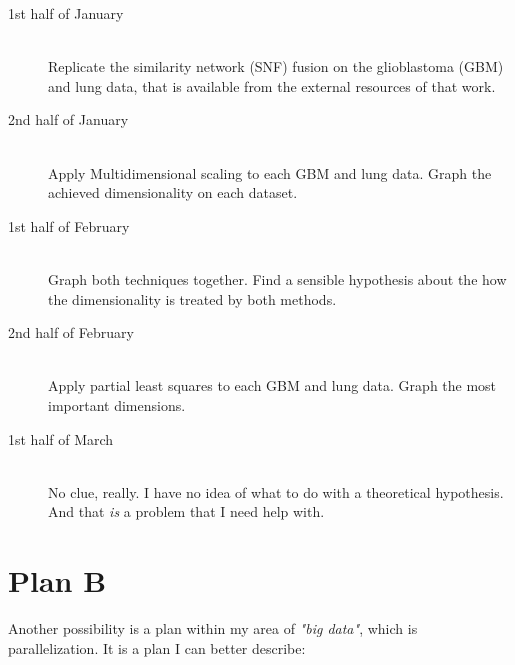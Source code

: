 \documentclass[11pt,a4paper,twoside,openright]{report}
\begin{document}
\begin{description}
\item[1st half of January] \hfill \\
Replicate the similarity network (SNF) fusion on the glioblastoma (GBM) and
lung data, that is available from the external resources of that work.

\item[2nd half of January] \hfill \\
Apply Multidimensional scaling to each GBM and lung data.  Graph the achieved
dimensionality on each dataset.

\item[1st half of February] \hfill \\
Graph both techniques together.  Find a sensible hypothesis about the how the
dimensionality is treated by both methods.

\item[2nd half of February] \hfill \\
Apply partial least squares to each GBM and lung data.  Graph the most
important dimensions.

\item[1st half of March] \hfill \\
No clue, really.  I have no idea of what to do with a theoretical hypothesis.
And that \emph{is} a problem that I need help with.
\end{description}

\clearpage{\pagestyle{empty}\cleardoublepage}
\chapter{Plan B}

Another possibility is a plan within my area of \emph{"big data"}, which is
parallelization.  It is a plan I can better describe:
\end{document}
